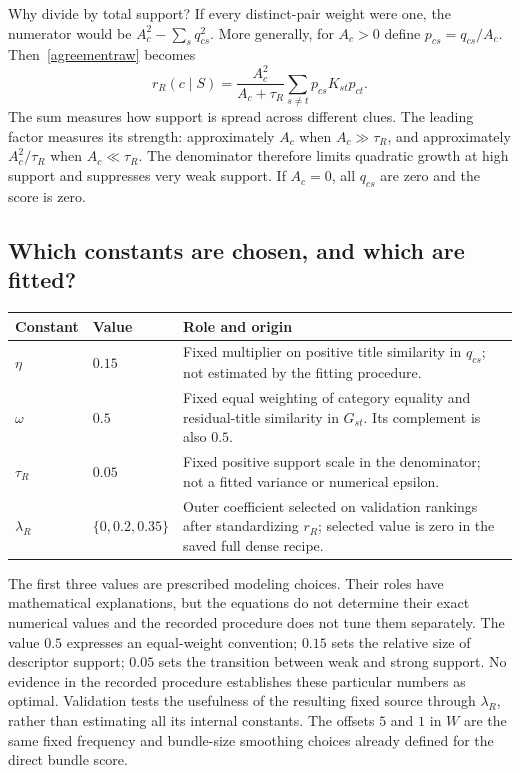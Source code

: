 \documentclass[11pt,a4paper]{article}
\numberwithin{equation}{section}
\begin{document}
Why divide by total support? If every distinct-pair weight were one, the
numerator would be $A_c^2-\sum_s q_{cs}^2$. More generally, for $A_c>0$ define
$p_{cs}=q_{cs}/A_c$. Then~\eqref{agreementraw} becomes
\[
 r_R(c\mid S)=\frac{A_c^2}{A_c+\tau_R}
                  \sum_{s\ne t}p_{cs}K_{st}p_{ct}.
\]
The sum measures how support is spread across different clues. The leading
factor measures its strength: approximately $A_c$ when $A_c\gg\tau_R$, and
approximately $A_c^2/\tau_R$ when $A_c\ll\tau_R$. The denominator therefore
limits quadratic growth at high support and suppresses very weak support.
If $A_c=0$, all $q_{cs}$ are zero and the score is zero.

\subsection{Which constants are chosen, and which are fitted?}
\begin{center}\small
\begin{tabularx}{\linewidth}{@{}llX@{}}\toprule
Constant & Value & Role and origin \\\midrule
$\eta$ & $0.15$ & Fixed multiplier on positive title similarity in $q_{cs}$; not estimated by the fitting procedure. \\
$\omega$ & $0.5$ & Fixed equal weighting of category equality and residual-title similarity in $G_{st}$. Its complement is also $0.5$. \\
$\tau_R$ & $0.05$ & Fixed positive support scale in the denominator; not a fitted variance or numerical epsilon. \\
$\lambda_R$ & $\{0,0.2,0.35\}$ & Outer coefficient selected on validation rankings after standardizing $r_R$; selected value is zero in the saved full dense recipe. \\\bottomrule
\end{tabularx}\end{center}
The first three values are prescribed modeling choices. Their roles have
mathematical explanations, but the equations do not determine their exact
numerical values and the recorded procedure does not tune them separately.
The value $0.5$ expresses an equal-weight convention; $0.15$ sets the relative
size of descriptor support; $0.05$ sets the transition between weak and strong
support. No evidence in the recorded procedure establishes these particular
numbers as optimal. Validation tests the usefulness of the resulting fixed
source through $\lambda_R$, rather than estimating all its internal constants.
The offsets $5$ and $1$ in $W$ are the same fixed frequency and bundle-size
smoothing choices already defined for the direct bundle score.
\end{document}
